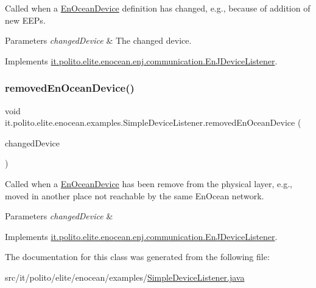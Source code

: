 Called when a \hyperlink{}{En\+Ocean\+Device} definition has changed, e.\+g., because of addition of new E\+E\+Ps.


\begin{DoxyParams}{Parameters}
{\em changed\+Device} & The changed device. \\
\hline
\end{DoxyParams}


Implements \hyperlink{interfaceit_1_1polito_1_1elite_1_1enocean_1_1enj_1_1communication_1_1_en_j_device_listener_a90117812e489a4b4b7d9da1249e6ab90}{it.\+polito.\+elite.\+enocean.\+enj.\+communication.\+En\+J\+Device\+Listener}.

\hypertarget{classit_1_1polito_1_1elite_1_1enocean_1_1examples_1_1_simple_device_listener_a7bc702e3f0f7175e052af6fddb39fe83}{}\label{classit_1_1polito_1_1elite_1_1enocean_1_1examples_1_1_simple_device_listener_a7bc702e3f0f7175e052af6fddb39fe83} 
\subsubsection{\texorpdfstring{removed\+En\+Ocean\+Device()}{removedEnOceanDevice()}}
{\footnotesize\ttfamily void it.\+polito.\+elite.\+enocean.\+examples.\+Simple\+Device\+Listener.\+removed\+En\+Ocean\+Device (\begin{DoxyParamCaption}\item[{\hyperlink{classit_1_1polito_1_1elite_1_1enocean_1_1enj_1_1model_1_1_en_ocean_device}{En\+Ocean\+Device}}]{changed\+Device }\end{DoxyParamCaption})}

Called when a \hyperlink{}{En\+Ocean\+Device} has been remove from the physical layer, e.\+g., moved in another place not reachable by the same En\+Ocean network.


\begin{DoxyParams}{Parameters}
{\em changed\+Device} & \\
\hline
\end{DoxyParams}


Implements \hyperlink{interfaceit_1_1polito_1_1elite_1_1enocean_1_1enj_1_1communication_1_1_en_j_device_listener_aca9114b95c51e8a4afaa4240dddf0a7d}{it.\+polito.\+elite.\+enocean.\+enj.\+communication.\+En\+J\+Device\+Listener}.



The documentation for this class was generated from the following file\+:\begin{DoxyCompactItemize}
\item 
src/it/polito/elite/enocean/examples/\hyperlink{_simple_device_listener_8java}{Simple\+Device\+Listener.\+java}\end{DoxyCompactItemize}
